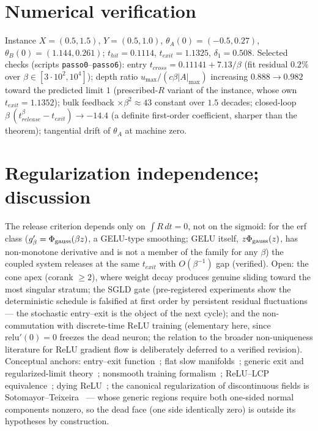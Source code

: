 \documentclass[11pt]{article}
\begin{document}
\section{Numerical verification}\label{sec:num}
Instance $X=(0.5,1.5)$, $Y=(0.5,1.0)$, $\theta_A(0)=(-0.5,0.27)$,
$\theta_B(0)=(1.144,0.261)$; $t_{hit}=0.1114$, $t_{exit}=1.1325$,
$\delta_1=0.508$. Selected checks (scripts \texttt{passo0}--\texttt{passo6}):
entry $t_{cross}=0.11141+7.13/\beta$ (fit residual $0.2\%$ over
$\beta\in[3\cdot10^2,10^4]$); depth ratio $u_{\max}/(c\beta|A|_{\max})$ increasing $0.888\to0.982$ toward
the predicted limit $1$ (prescribed-$R$ variant of the instance, whose own
$t_{exit}=1.1352$);
bulk feedback $\times\beta^2\approx43$ constant over $1.5$ decades; closed-loop
$\beta\,(t^\beta_{release}-t_{exit})\to-14.4$ (a definite first-order
coefficient, sharper than the theorem); tangential drift of $\theta_A$ at
machine zero.

\section{Regularization independence; discussion}\label{sec:reg}
The release criterion depends only on $\int R\,dt=0$, not on the sigmoid: for
the erf class ($g_\beta'=\Phi_{\rm gauss}(\beta z)$, a GELU-type smoothing;
GELU itself, $z\Phi_{\rm gauss}(z)$, has non-monotone derivative and is not a
member of the family for any $\beta$) the coupled system releases at the same $t_{exit}$ with
$O(\beta^{-1})$ gap (verified). Open: the cone apex (corank $\ge2$), where
weight decay produces genuine sliding toward the most singular stratum; the
SGLD gate (pre-registered experiments show the deterministic schedule is
falsified at first order by persistent residual fluctuations --- the stochastic
entry--exit is the object of the next cycle); and the non-commutation with discrete-time ReLU training (elementary here,
since $\mathrm{relu}'(0)=0$ freezes the dead neuron; the relation to the
broader non-uniqueness literature for ReLU gradient flow is deliberately
deferred to a verified revision). Conceptual anchors: entry--exit
function~\cite{DMS16,SDR23}; flat slow manifolds~\cite{Kri17}; generic exit
and regularized-limit theory~\cite{Jef16,GH}; nonsmooth training
formalism~\cite{BP21}; ReLU--LCP equivalence~\cite{APM20}; dying
ReLU~\cite{Lu19}; the canonical regularization of discontinuous fields is
Sotomayor--Teixeira~\cite{ST98,LST07} --- whose generic regions require both
one-sided normal components nonzero, so the dead face (one side identically
zero) is outside its hypotheses by construction.
\end{document}
